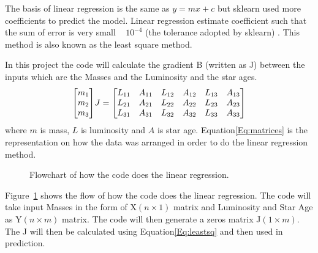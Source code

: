 The basis of linear regression is the same as $y= mx+c$ but sklearn used more coefficients to predict the model. Linear regression estimate  coefficient such that the sum of error is very small ~  $10^{-4}$ (the tolerance adopted by sklearn) . This method is also known as the least square method.

In this project the code will calculate the gradient B (written as J)  between the inputs which are the Masses and the Luminosity and the star ages.
\begin{equation}
    \mqty[
        m_{1}\\m_{2}\\m_{3}  
    ]
    J
    =
    \mqty[
        L_{11}&A_{11}&L_{12}&A_{12}&L_{13}&A_{13}\\
        L_{21}&A_{21}&L_{22}&A_{22}&L_{23}&A_{23}\\
        L_{31}&A_{31}&L_{32}&A_{32}&L_{33}&A_{33}
    ]
    \label{Eq:matrices}
\end{equation}
where $m$ is mass, $L$ is luminosity and $A$ is star age.
Equation\ref{Eq:matrices} is the representation on how the data was arranged in order to do the linear regression method. 

\begin{figure}[H]
    \centering

    \caption{Flowchart of how the code does the linear regression.}
    \label{fig:flow}
\end{figure}

Figure~\ref{fig:flow} shows the flow of how the code does the linear regression. The code will take input Masses in the form of X$(n\times1)$ matrix and Luminosity and Star Age as Y$(n\times m)$ matrix. The code will then generate a zeros matrix J$(1\times m)$. The J will then be calculated using Equation\ref{Eq:leastsq} and then used in prediction.


